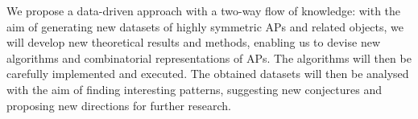 We propose a data-driven approach with a two-way flow of knowledge: with the aim of generating new datasets of highly symmetric APs and related objects, we will develop new theoretical results and methods, enabling us to devise new algorithms and combinatorial representations of APs. The algorithms will then be carefully implemented and executed.
The obtained datasets will then be analysed with the aim of finding interesting patterns, suggesting new conjectures and proposing new directions for further research.



